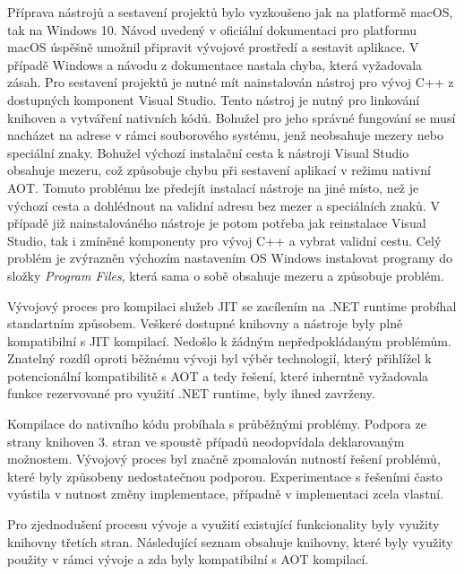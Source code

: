 Příprava nástrojů a sestavení projektů bylo vyzkoušeno jak na platformě macOS, tak na Windows 10. Návod uvedený v oficiální dokumentaci pro platformu macOS úspěšně umožnil připravit vývojové prostředí a sestavit aplikace. \cite{netdocsnativeguide} V případě Windows a návodu z dokumentace nastala chyba, která vyžadovala zásah. Pro sestavení projektů je nutné mít nainstalován nástroj pro vývoj C++ z dostupných komponent Visual Studio. Tento nástroj je nutný pro linkování knihoven a vytváření nativních kódů. Bohužel pro jeho správné fungování se musí nacházet na adrese v rámci souborového systému, jenž neobsahuje mezery nebo speciální znaky. Bohužel výchozí instalační cesta k nástroji Visual Studio obsahuje mezeru, což způsobuje chybu při sestavení aplikací v režimu nativní AOT. Tomuto problému lze předejít instalací nástroje na jiné místo, než je výchozí cesta a dohlédnout na validní adresu bez mezer a speciálních znaků. V případě již nainstalováného nástroje je potom potřeba jak reinstalace Visual Studio, tak i zmíněné komponenty pro vývoj C++ a vybrat validní cestu. Celý problém je zvýrazněn výchozím nastavením OS Windows instalovat programy do složky \emph{Program Files}, která sama o sobě obsahuje mezeru a způsobuje problém.


Vývojový proces pro kompilaci služeb JIT se zacílením na .NET runtime probíhal standartním způsobem. Veškeré dostupné knihovny a nástroje byly plně kompatibilní s JIT kompilací. Nedošlo k žádným nepředpokládaným problémům. Znatelný rozdíl oproti běžnému vývoji byl výběr technologií, který přihlížel k potencionální kompatibilitě s AOT a tedy řešení, které inherntně vyžadovala funkce rezervované pro využití .NET runtime, byly ihned zavrženy.


Kompilace do nativního kódu probíhala s průběžnými problémy. Podpora ze strany knihoven 3. stran ve spoustě případů neodopvídala deklarovaným možnostem. Vývojový proces byl značně zpomalován nutností řešení problémů, které byly způsobeny nedostatečnou podporou. Experimentace s řešeními často vyústila v nutnost změny implementace, případně v implementaci zcela vlastní.


Pro zjednodušení procesu vývoje a využití existující funkcionality byly využity knihovny třetích stran. Následující seznam obsahuje knihovny, které byly využity použity v rámci vývoje a zda byly kompatibilní s AOT kompilací.


